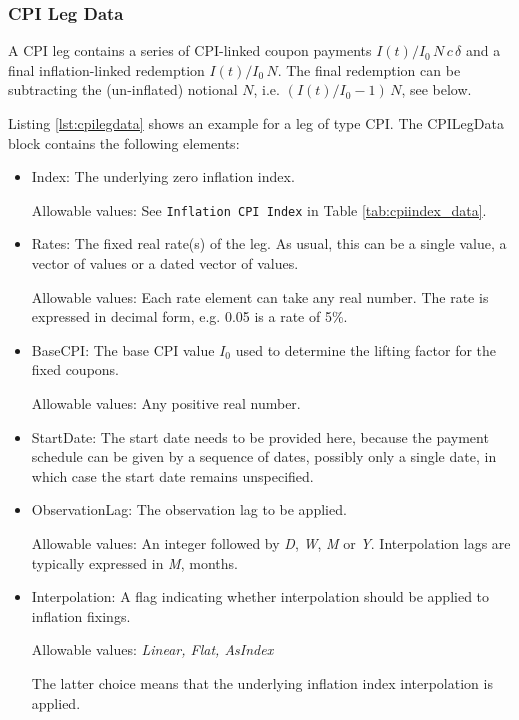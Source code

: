\subsubsection{CPI Leg Data}
\label{ss:cpilegdata}

A CPI leg contains a series of CPI-linked coupon payments $I(t)/I_0\,N\,c\,\delta$ and a final
inflation-linked redemption $I(t)/I_0\,N$. The final redemption can be
subtracting the (un-inflated) notional $N$, i.e. $(I(t)/I_0-1)\,N$,
see below.

Listing \ref{lst:cpilegdata} shows an example for a leg of type CPI. The CPILegData block contains the following
elements:

\begin{itemize}
\item Index: The underlying zero inflation index.

Allowable values:  See \lstinline!Inflation CPI Index! in Table \ref{tab:cpiindex_data}.
\item Rates: The fixed real rate(s) of the leg. As usual, this can be a single value, a vector of values or a dated vector of
  values.
 
 Allowable values: Each rate element can take any  real number. The rate is
  expressed in decimal form, e.g. 0.05 is a rate of 5\%.
\item BaseCPI: The base CPI value $I_0$ used to determine the lifting factor for the fixed coupons.

Allowable values:  Any positive real number.

\item StartDate: The start date needs to be provided here, because the payment
  schedule can be given by a sequence of dates, possibly only a single
  date, in which case the start date remains unspecified.

\item ObservationLag: The observation lag to be applied.

Allowable values: An integer followed by \emph{D}, \emph{W}, \emph{M} or \emph{Y}. Interpolation lags are typically expressed in \emph{M}, months.

\item Interpolation: A flag indicating whether interpolation should be applied to inflation fixings.

Allowable values:  \emph{Linear, Flat, AsIndex} 

\medskip
The latter choice means that the underlying inflation index
interpolation is applied.


\end{itemize}
